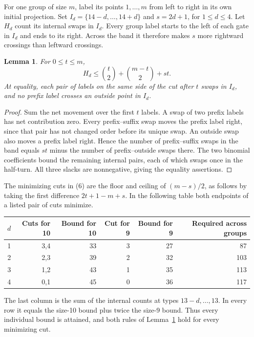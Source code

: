 \documentclass[11pt]{article}
\newtheorem{lemma}[theorem]{Lemma}
\begin{document}
For one group of size \(m\), label its points \(1,\ldots,m\) from left to right in its own initial projection. Set \(I_d=\{14-d,\ldots,14+d\}\) and \(s=2d+1\), for \(1\le d\le4\). Let \(H_d\) count its internal swaps in \(I_d\). Every group label starts to the left of each gate in \(I_d\) and ends to its right. Across the band it therefore makes \(s\) more rightward crossings than leftward crossings.

\begin{lemma}\label{lem:band}
For \(0\le t\le m\),
\[
             H_d\le \binom{t}{2}+\binom{m-t}{2}+st.               \tag{6}
\]
At equality, each pair of labels on the same side of the cut after \(t\) swaps in \(I_d\), and no prefix label crosses an outside point in \(I_d\).
\end{lemma}
\begin{proof}
Sum the net movement over the first \(t\) labels. A swap of two prefix labels has net contribution zero. Every prefix--suffix swap moves the prefix label right, since that pair has not changed order before its unique swap. An outside swap also moves a prefix label right. Hence the number of prefix--suffix swaps in the band equals \(st\) minus the number of prefix--outside swaps there. The two binomial coefficients bound the remaining internal pairs, each of which swaps once in the half-turn. All three slacks are nonnegative, giving the equality assertions.
\end{proof}

The minimizing cuts in (6) are the floor and ceiling of \((m-s)/2\), as follows by taking the first difference \(2t+1-m+s\). In the following table both endpoints of a listed pair of cuts minimize.
\begin{center}
\begin{tabular}{rrrrrr}
\toprule
\(d\)&Cuts for 10&Bound for 10&Cut for 9&Bound for 9&Required across groups\\\midrule
1&3,4&33&3&27&87\\
2&2,3&39&2&32&103\\
3&1,2&43&1&35&113\\
4&0,1&45&0&36&117\\\bottomrule
\end{tabular}
\end{center}
The last column is the sum of the internal counts at types \(13-d,\ldots,13\). In every row it equals the size-10 bound plus twice the size-9 bound. Thus every individual bound is attained, and both rules of Lemma~\ref{lem:band} hold for every minimizing cut.
\end{document}
